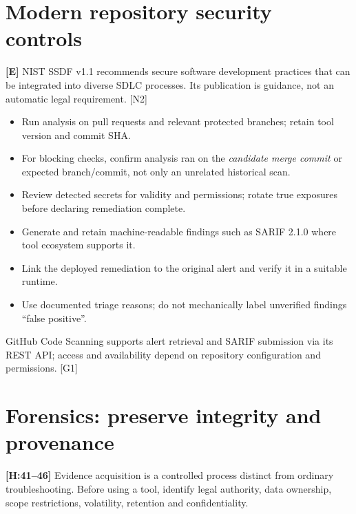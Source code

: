 \documentclass[10pt,letterpaper,oneside]{article}
\newcommand{\handbookref}[1]{\textsf{\color{accent}\textbf{[H:#1]}}}
\newcommand{\modernext}{\textsf{\color{muted}\textbf{[E]}}}
\begin{document}
\section{Modern repository security controls}\modernext{}
NIST SSDF v1.1 recommends secure software development practices that can be integrated into diverse SDLC processes. Its publication is guidance, not an automatic legal requirement. [N2]
\begin{itemize}
\item Run analysis on pull requests and relevant protected branches; retain tool version and commit SHA.
\item For blocking checks, confirm analysis ran on the \emph{candidate merge commit} or expected branch/commit, not only an unrelated historical scan.
\item Review detected secrets for validity and permissions; rotate true exposures before declaring remediation complete.
\item Generate and retain machine-readable findings such as SARIF 2.1.0 where tool ecosystem supports it.
\item Link the deployed remediation to the original alert and verify it in a suitable runtime.
\item Use documented triage reasons; do not mechanically label unverified findings ``false positive''.
\end{itemize}
GitHub Code Scanning supports alert retrieval and SARIF submission via its REST API; access and availability depend on repository configuration and permissions. [G1]

\section{Forensics: preserve integrity and provenance}
\handbookref{41--46} Evidence acquisition is a controlled process distinct from ordinary troubleshooting. Before using a tool, identify legal authority, data ownership, scope restrictions, volatility, retention and confidentiality.
\end{document}
